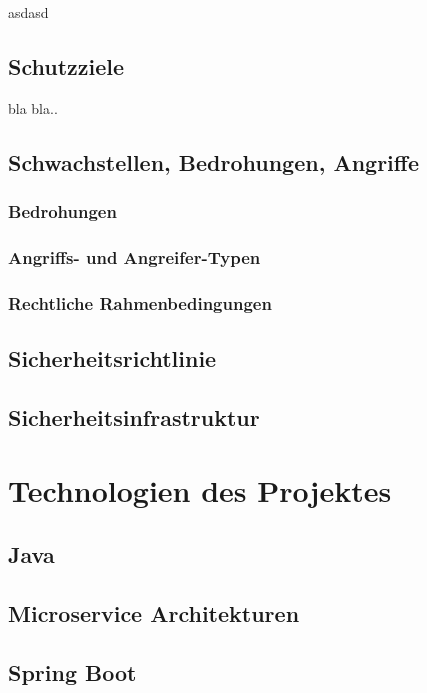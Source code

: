 asdasd

\subsection{Schutzziele}

bla bla..

\subsection{Schwachstellen, Bedrohungen, Angriffe}

\subsubsection{Bedrohungen}

\subsubsection{Angriffs- und Angreifer-Typen}

\subsubsection{Rechtliche Rahmenbedingungen}

\subsection{Sicherheitsrichtlinie}

\subsection{Sicherheitsinfrastruktur}

\section{Technologien des Projektes}

\subsection{Java}

\subsection{Microservice Architekturen}

\subsection{Spring Boot}


